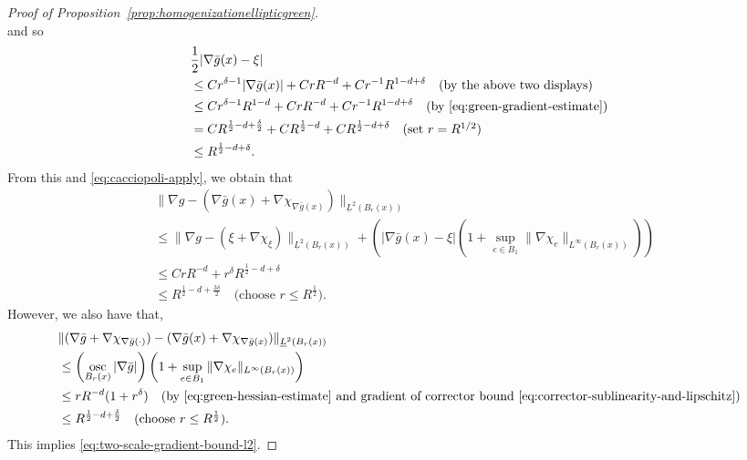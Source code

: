 \documentclass[12pt]{amsart}
\numberwithin{equation}{section}
\begin{document}
\begin{proof}[Proof of Proposition~\ref{prop:homogenizationellipticgreen}]
\begin{equation*}
		\end{equation*}
		and so 
		\begin{align*}
			&\frac{1}{2} | \nabla \bar{g}(x) - \xi |  \\
			&\leq C r^{\delta-1} |\nabla \bar g(x)| + C r R^{-d}  + C r^{-1} R^{1 - d + \delta}   \quad \mbox{(by the above two displays)} \\
			&\leq C  r^{\delta-1} R^{1-d} + C r R^{-d} + C r^{-1} R^{1 - d + \delta}\quad \mbox{(by \eqref{eq:green-gradient-estimate})} \\
			&= C R^{\frac{1}{2} - d + \frac{\delta}{2} } + C R^{\frac{1}{2} - d} + C R^{\frac{1}{2} - d + \delta} \quad\mbox{(set $r = R^{1/2}$)} \\
			&\leq R^{\frac{1}{2}-d + \delta}.
		\end{align*}
		From this and \eqref{eq:cacciopoli-apply}, we obtain that 
		\begin{align*}
			&\| \nabla g - (\nabla \bar{g}(x) + \nabla \chi_{\nabla \bar{g}(x)}) \|_{\underline{L}^2(B_r(x))} \\
			&\leq  \| \nabla g - (\xi + \nabla \chi_{\xi}) \|_{\underline{L}^2(B_r(x))} 
			+ \left( | \nabla \bar{g}(x) - \xi| ( 1 + \sup_{e \in B_1} \| \nabla \chi_e \|_{L^\infty(B_r(x))} )\right) \\
			&\leq C r R^{-d} + r^\delta R^{\frac{1}{2}-d + \delta} \\
			&\leq R^{\frac{1}{2} - d + \frac{3\delta}{2}}  \quad \mbox{(choose $r \leq R^{\frac{1}{2}}$)}.
		\end{align*}
		However, we also have that, 
		\begin{align*}
			&\| (\nabla \bar{g} + \nabla \chi_{\nabla \bar{g}(\cdot)}) - (\nabla \bar{g}(x) + \nabla \chi_{\nabla \bar{g}(x)}) \|_{\underline{L}^2(B_r(x))} \\
			&\leq  \left( \operatorname*{osc}_{B_r(x)} |\nabla \bar{g}| \right)  \left( 1 + \sup_{e \in B_1} \| \nabla \chi_e \|_{L^\infty(B_r(x))} \right) \\
			&\leq  r R^{-d}(1 + r^\delta)\quad \mbox{(by \eqref{eq:green-hessian-estimate} and gradient of corrector bound~\eqref{eq:corrector-sublinearity-and-lipschitz})} \\
			&\leq R^{\frac{1}{2} - d + \frac{\delta}{2}}  \quad \mbox{(choose $r \leq  R^{\frac{1}{2}}$)}. 
		\end{align*}
		This implies  \eqref{eq:two-scale-gradient-bound-l2}. 
	\end{proof}
	
\end{document}
